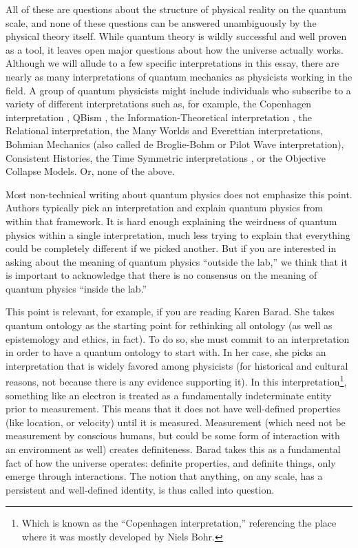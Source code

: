 \documentclass[12pt,onecolumn,preprintnumbers,amsmath,amssymbn,reprint,nofootinbib,superscriptaddress]{revtex4}    %
\begin{document}
All of these are questions about the structure of physical reality on the quantum scale, and none of these questions can be answered unambiguously by the physical theory itself.  While quantum theory is wildly successful and well proven as a tool, it leaves open major questions about how the universe actually works. Although we will allude to a few specific interpretations in this essay, there are nearly as many interpretations of quantum mechanics as physicists working in the field.  
A group of quantum physicists might include individuals who subscribe to a variety of different interpretations \cite{interpretations} such as, for example, the Copenhagen interpretation \cite{copenhagen}, QBism \cite{qbism}, the Information-Theoretical interpretation \cite{information,Bub}, the Relational interpretation\cite{Bitbol, Rovelli}, the Many Worlds and Everettian interpretations\cite{manyworlds}, Bohmian Mechanics (also called de Broglie-Bohm or Pilot Wave interpretation)\cite{bohm}, Consistent Histories\cite{histories}, the Time Symmetric interpretations \cite{retrocausal, aharonov,Wharton07}, or the Objective Collapse Models\cite{collapse}.  Or, none of the above.

Most non-technical writing about quantum physics does not emphasize this point.  Authors typically pick an interpretation and explain quantum physics from within that framework. It is hard enough explaining the weirdness of quantum physics within a single interpretation, much less trying to explain that everything could be completely different if we picked another.  But if you are interested in asking about the meaning of quantum physics ``outside the lab,'' we think that it is important to acknowledge that there is no consensus on the meaning of quantum physics ``inside the lab.''  

This point is relevant, for example, if you are reading Karen Barad. She takes quantum ontology as the starting point for rethinking all ontology (as well as epistemology and ethics, in fact). To do so, she must commit to an interpretation in order to have a quantum ontology to start with.  In her case, she picks an interpretation that is widely favored among physicists (for historical and cultural reasons, not because there is any evidence supporting it).  In this interpretation\footnote{Which is known as the ``Copenhagen interpretation,'' referencing the place where it was mostly developed by Niels Bohr.}, something like an electron is treated as a fundamentally indeterminate entity prior to measurement.  This means that it does not have well-defined properties (like location, or velocity) until it is measured.  Measurement (which need not be measurement by conscious humans, but could be some form of interaction with an environment as well) creates definiteness.  Barad takes this as a fundamental fact of how the universe operates:  definite properties, and definite things, only emerge through interactions.  The notion that anything, on any scale, has a persistent and well-defined identity, is thus called into question.  
\end{document}

